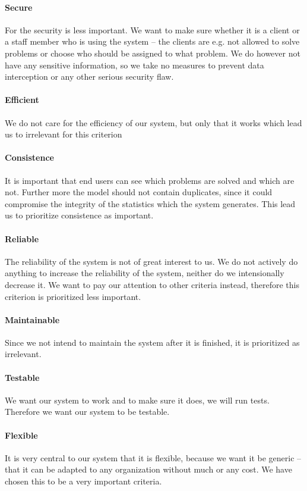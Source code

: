\paragraph{Secure}
For the \hdesk[] security is less important. We want to make sure whether it is a client or a staff member who is using the system -- the clients are e.g. not allowed to solve problems or choose who should be assigned to what problem.
We do however not have any sensitive information, so we take no measures to prevent data interception or any other serious security flaw.
\paragraph{Efficient}
We do not care for the efficiency of our system, but only that it works which lead us to irrelevant for this criterion 
\paragraph{Consistence}
It is important that end users can see which problems are solved and which are not.
Further more the \hdesk[] model should not contain duplicates, since it could compromise the integrity of the statistics which the system generates.
This lead us to prioritize consistence as important.
\paragraph{Reliable}
The reliability of the \hdesk[] system is not of great interest to us.
We do not actively do anything to increase the reliability of the system, neither do we intensionally decrease it.
We want to pay our attention to other criteria instead, therefore this criterion is prioritized less important.
\paragraph{Maintainable}
Since we not intend to maintain the system after it is finished, it is prioritized as irrelevant.
\paragraph{Testable}
We want our system to work and to make sure it does, we will run tests.
Therefore we want our system to be testable.
\paragraph{Flexible}
It is very central to our system that it is flexible, because we want it be generic -- that it can be adapted to any organization without much or any cost.
We have chosen this to be a very important criteria.

